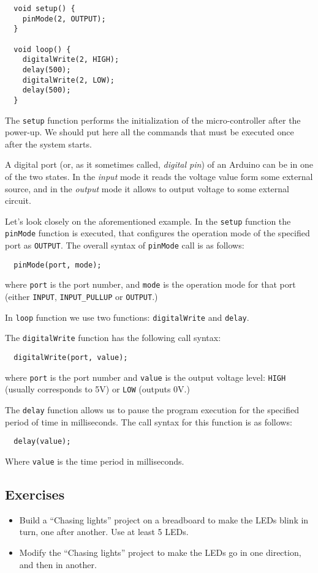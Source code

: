 \documentclass[../sparc.tex]{subfiles}
\begin{document}
\begin{verbatim}
  void setup() {
    pinMode(2, OUTPUT);
  }

  void loop() {
    digitalWrite(2, HIGH);
    delay(500);
    digitalWrite(2, LOW);
    delay(500);
  }
\end{verbatim}


The \texttt{setup} function performs the initialization of the micro-controller
after the power-up.  We should put here all the commands that must be executed
once after the system starts.

A digital port (or, as it sometimes called, \emph{digital pin}) of an Arduino
can be in one of the two states.  In the \emph{input} mode it reads the voltage
value form some external source, and in the \emph{output} mode it allows to
output voltage to some external circuit.

Let's look closely on the aforementioned example.  In the \texttt{setup}
function the \texttt{pinMode} function is executed, that configures the
operation mode of the specified port as \texttt{OUTPUT}.  The overall syntax of
\texttt{pinMode} call is as follows:

\begin{verbatim}
  pinMode(port, mode);
\end{verbatim}

where \texttt{port} is the port number, and \texttt{mode} is the operation mode
for that port (either \texttt{INPUT}, \texttt{INPUT\_PULLUP} or
\texttt{OUTPUT}.)

In \texttt{loop} function we use two functions: \texttt{digitalWrite} and
\texttt{delay}.

The \texttt{digitalWrite} function has the following call syntax:

\begin{verbatim}
  digitalWrite(port, value);
\end{verbatim}

where \texttt{port} is the port number and \texttt{value} is the output voltage
level: \texttt{HIGH} (usually corresponds to 5V) or \texttt{LOW} (outputs 0V.)

The \texttt{delay} function allows us to pause the program execution for the
specified period of time in milliseconds.  The call syntax for this function is
as follows:

\begin{verbatim}
  delay(value);
\end{verbatim}

Where \texttt{value} is the time period in milliseconds.

\subsection{Exercises}
\begin{itemize}
\item Build a ``Chasing lights'' project on a breadboard to make the LEDs blink
  in turn, one after another.  Use at least 5 LEDs.
\item Modify the ``Chasing lights'' project to make the LEDs go in one
  direction, and then in another.
\end{itemize}
\end{document}
